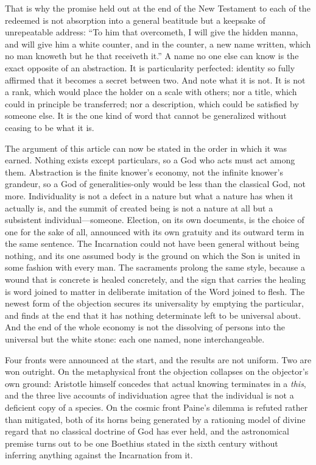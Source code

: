 That is why the promise held out at the end of the New Testament to each of the redeemed is not absorption into a general beatitude but a keepsake of unrepeatable address: ``To him that overcometh, I will give the hidden manna, and will give him a white counter, and in the counter, a new name written, which no man knoweth but he that receiveth it.'' A name no one else can know is the exact opposite of an abstraction. It is particularity perfected: identity so fully affirmed that it becomes a secret between two. And note what it is not. It is not a rank, which would place the holder on a scale with others; nor a title, which could in principle be transferred; nor a description, which could be satisfied by someone else. It is the one kind of word that cannot be generalized without ceasing to be what it is.

The argument of this article can now be stated in the order in which it was earned. Nothing exists except particulars, so a God who acts must act among them. Abstraction is the finite knower's economy, not the infinite knower's grandeur, so a God of generalities-only would be less than the classical God, not more. Individuality is not a defect in a nature but what a nature has when it actually is, and the summit of created being is not a nature at all but a subsistent individual---someone. Election, on its own documents, is the choice of one for the sake of all, announced with its own gratuity and its outward term in the same sentence. The Incarnation could not have been general without being nothing, and its one assumed body is the ground on which the Son is united in some fashion with every man. The sacraments prolong the same style, because a wound that is concrete is healed concretely, and the sign that carries the healing is word joined to matter in deliberate imitation of the Word joined to flesh. The newest form of the objection secures its universality by emptying the particular, and finds at the end that it has nothing determinate left to be universal about. And the end of the whole economy is not the dissolving of persons into the universal but the white stone: each one named, none interchangeable.

Four fronts were announced at the start, and the results are not uniform. Two are won outright. On the metaphysical front the objection collapses on the objector's own ground: Aristotle himself concedes that actual knowing terminates in a \emph{this}, and the three live accounts of individuation agree that the individual is not a deficient copy of a species. On the cosmic front Paine's dilemma is refuted rather than mitigated, both of its horns being generated by a rationing model of divine regard that no classical doctrine of God has ever held, and the astronomical premise turns out to be one Boethius stated in the sixth century without inferring anything against the Incarnation from it.

